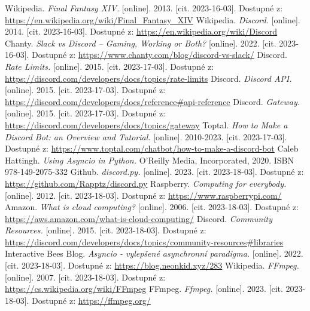 \documentclass[
  program=inf,
biblatex=false,
sourcecodes=true,
joinlists=true,
  figures=true,
  tables=true,
  glossaries=true,
  index=false
]{kidiplom}
\begin{document}
\begin{thebibliography}{99}
 Wikipedia. {\it Final Fantasy XIV.} [online]. 2013. [cit. 2023-16-03]. Dostupné z: \url{https://en.wikipedia.org/wiki/Final_Fantasy_XIV}
 Wikipedia. {\it Discord.} [online]. 2014. [cit. 2023-16-03]. Dostupné z: \url{https://en.wikipedia.org/wiki/Discord}
 Chanty. {\it Slack vs Discord – Gaming, Working or Both?} [online]. 2022. [cit. 2023-16-03]. Dostupné z: \url{https://www.chanty.com/blog/discord-vs-slack/}
 Discord. {\it Rate Limits.} [online]. 2015. [cit. 2023-17-03]. Dostupné z: \url{https://discord.com/developers/docs/topics/rate-limits}
 Discord. {\it Discord API.} [online]. 2015. [cit. 2023-17-03]. Dostupné z: \url{https://discord.com/developers/docs/reference#api-reference}
 Discord. {\it Gateway.} [online]. 2015. [cit. 2023-17-03]. Dostupné z: \url{https://discord.com/developers/docs/topics/gateway}
 Toptal. {\it How to Make a Discord Bot: an Overview and Tutorial.} [online]. 2010-2023. [cit. 2023-17-03]. Dostupné z: \url{https://www.toptal.com/chatbot/how-to-make-a-discord-bot}
 Caleb Hattingh. {\it Using Asyncio in Python.} O'Reilly Media, Incorporated, 2020. ISBN 978-149-2075-332
 Github. {\it discord.py.} [online]. 2023. [cit. 2023-18-03]. Dostupné z: \url{https://github.com/Rapptz/discord.py}
 Raspberry. {\it Computing for everybody.} [online]. 2012. [cit. 2023-18-03]. Dostupné z: \url{https://www.raspberrypi.com/}
 Amazon. {\it What is cloud computing?} [online]. 2006. [cit. 2023-18-03]. Dostupné z: \url{https://aws.amazon.com/what-is-cloud-computing/}
 Discord. {\it Community Resources.} [online]. 2015. [cit. 2023-18-03]. Dostupné z: \url{https://discord.com/developers/docs/topics/community-resources#libraries}
 Interactive Bees Blog. {\it Asyncio - vylepšené asynchronní paradigma.} [online]. 2022. [cit. 2023-18-03]. Dostupné z: \url{https://blog.neonkid.xyz/283}
 Wikipedia. {\it FFmpeg.} [online]. 2007. [cit. 2023-18-03]. Dostupné z: \url{https://cs.wikipedia.org/wiki/FFmpeg}
 FFmpeg. {\it Ffmpeg.} [online]. 2023. [cit. 2023-18-03]. Dostupné z: \url{https://ffmpeg.org/}

\end{thebibliography}

\printindex
\end{document}
